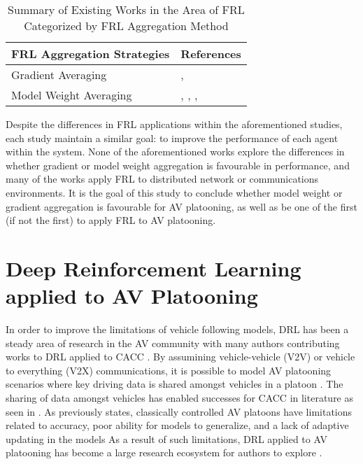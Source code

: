 \begin{table}[H]
  \centering
  \caption{Summary of Existing Works in the Area of FRL Categorized by FRL Aggregation Method}
    \begin{tabular}{ll} \toprule
    \textbf{FRL Aggregation Strategies} & \textbf{References} \\ \midrule
    \midrule
    Gradient Averaging & \cite{BrendanMcMahan2017a}, \cite{LimHyun2021} \\
    Model Weight Averaging & \cite{Liang2019}, \cite{ZhangX2020}, \cite{WangXiaofei2021}, \cite{Huang2021} \\ \bottomrule
    \end{tabular}%
  \label{tab:addlabel}%
\end{table}%


Despite the differences in FRL applications within the aforementioned studies, each study
maintain a similar goal: to improve the performance of each agent within the system.  None
of the aforementioned works explore the differences in whether gradient or model weight
aggregation is favourable in performance, and many of the works apply FRL to distributed
network or communications environments.  It is the goal of this study to conclude whether
model weight or gradient aggregation is favourable for AV platooning, as well as be one of
the first (if not the first) to apply FRL to AV platooning.

\section{Deep Reinforcement Learning applied to AV Platooning} \label{sec:avRL}

In order to improve the limitations of vehicle following models, DRL has been a
steady area of research in the AV community with many authors contributing works
to DRL applied to CACC \cite{Schwarting2018, Li2019, Kendall2019, zhangYuxiang2020}.
By assumining vehicle-vehicle (V2V) or
vehicle to everything (V2X) communications, it is possible to model AV platooning scenarios
where key driving data is shared amongst vehicles in a platoon \cite{Schwarting2018,Hussain2019}.
The sharing of data amongst vehicles has enabled successes for CACC in literature as seen in \cite{LeiV2x}.
As previously states, classically controlled AV platoons have limitations related to
accuracy, poor ability for models to generalize, and a lack of adaptive updating in the models \cite{Zhu2018}
As a result of such limitations, DRL applied to AV platooning has become a large
research ecosystem for authors to explore \cite{Vinitsky2018, Kiran2020}.

